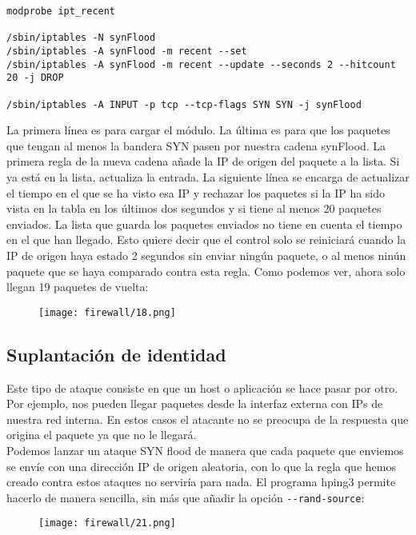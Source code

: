 \begin{lstlisting}
modprobe ipt_recent

/sbin/iptables -N synFlood
/sbin/iptables -A synFlood -m recent --set
/sbin/iptables -A synFlood -m recent --update --seconds 2 --hitcount 20 -j DROP

/sbin/iptables -A INPUT -p tcp --tcp-flags SYN SYN -j synFlood
\end{lstlisting}

La primera línea es para cargar el módulo. La última es para que los paquetes que tengan al menos la bandera SYN pasen por nuestra cadena synFlood. La primera regla de la nueva cadena añade la IP de origen del paquete a la lista. Si ya está en la lista, actualiza la entrada. La siguiente línea se encarga de actualizar el tiempo en el que se ha visto esa IP y rechazar los paquetes si la IP ha sido vista en la tabla en los últimos dos segundos y si tiene al menos 20 paquetes enviados. La lista que guarda los paquetes enviados no tiene en cuenta el tiempo en el que han llegado. Esto quiere decir que el control solo se reiniciará cuando la IP de origen haya estado 2 segundos sin enviar ningún paquete, o al menos ninún paquete que se haya comparado contra esta regla. Como podemos ver, ahora solo llegan 19 paquetes de vuelta:

\begin{figure}[H]
    \centering
    \texttt{[image: firewall/18.png]}
\end{figure}

\subsection{Suplantación de identidad}

Este tipo de ataque consiste en que un host o aplicación se hace pasar por otro. Por ejemplo, nos pueden llegar paquetes desde la interfaz externa con IPs de nuestra red interna. En estos casos el atacante no se preocupa de la respuesta que origina el paquete ya que no le llegará.\\

Podemos lanzar un ataque SYN flood de manera que cada paquete que enviemos se envíe con una dirección IP de origen aleatoria, con lo que la regla que hemos creado contra estos ataques no serviría para nada. El programa hping3 permite hacerlo de manera sencilla, sin más que añadir la opción \lstinline!--rand-source!:

\begin{figure}[H]
    \centering
    \texttt{[image: firewall/21.png]}
\end{figure}

